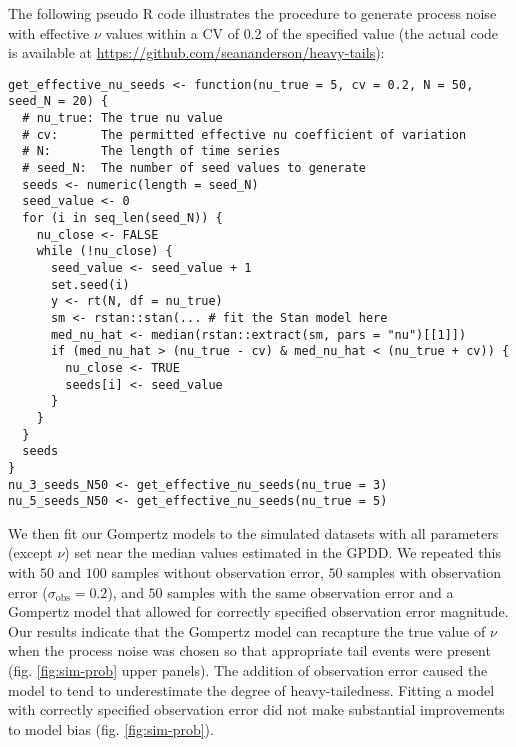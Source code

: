 \documentclass[12pt]{article}
\begin{document}
The following pseudo R code illustrates the procedure to generate process
noise with effective $\nu$ values within a CV of 0.2 of the specified value
(the actual code is available at
\url{https://github.com/seananderson/heavy-tails}):

\clearpage

\begin{footnotesize}
\begin{verbatim}
get_effective_nu_seeds <- function(nu_true = 5, cv = 0.2, N = 50, seed_N = 20) {
  # nu_true: The true nu value
  # cv:      The permitted effective nu coefficient of variation
  # N:       The length of time series
  # seed_N:  The number of seed values to generate
  seeds <- numeric(length = seed_N)
  seed_value <- 0
  for (i in seq_len(seed_N)) {
    nu_close <- FALSE
    while (!nu_close) {
      seed_value <- seed_value + 1
      set.seed(i)
      y <- rt(N, df = nu_true)
      sm <- rstan::stan(... # fit the Stan model here
      med_nu_hat <- median(rstan::extract(sm, pars = "nu")[[1]])
      if (med_nu_hat > (nu_true - cv) & med_nu_hat < (nu_true + cv)) {
        nu_close <- TRUE
        seeds[i] <- seed_value
      }
    }
  }
  seeds
}
nu_3_seeds_N50 <- get_effective_nu_seeds(nu_true = 3)
nu_5_seeds_N50 <- get_effective_nu_seeds(nu_true = 5)
\end{verbatim}
\end{footnotesize}

We then fit our Gompertz models to the simulated datasets with all parameters
(except $\nu$) set near the median values estimated in the GPDD. We repeated
this with $50$ and $100$ samples without observation error, $50$ samples with
observation error ($\sigma_\mathrm{obs} = 0.2$), and $50$ samples with the
same observation error and a Gompertz model that allowed for correctly
specified observation error magnitude. Our results indicate that the Gompertz
model can recapture the true value of $\nu$ when the process noise was chosen
so that appropriate tail events were present (fig.
\ref{fig:sim-prob} upper panels). The addition of observation error caused the
model to tend to underestimate the degree of heavy-tailedness. Fitting a model
with correctly specified observation error did not make substantial
improvements to model bias (fig. \ref{fig:sim-prob}).
\end{document}
